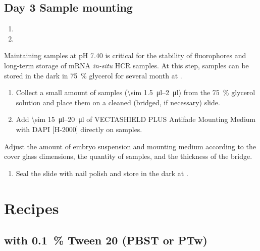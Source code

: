 \documentclass[10pt]{report}
\begin{document}
\subsection*{Day 3 \textendash{} Sample mounting}

\begin{enumerate}[series = steps]
	\item {}
	\item {}
\end{enumerate}

\bigskip\alert{Maintaining samples at pH 7.40 is critical for the stability of fluorophores and long-term storage of mRNA \textit{in-situ} HCR samples.}
\alert{At this step, samples can be stored in the dark in \qty{75}{\percent} glycerol for several month at \fourdegree.}

\begin{enumerate}[resume = steps]
	\item Collect a small amount of samples (\qtyrange{\sim 1.5}{2}{\ul}) from the \qty{75}{\percent} glycerol solution and place them on a cleaned (bridged, if necessary) slide.
	\item Add \qtyrange{\sim 15}{20}{\ul} of VECTASHIELD\textregistered{} PLUS Antifade Mounting Medium with DAPI [H-2000] directly on samples.
\end{enumerate}

\bigskip\alert{Adjust the amount of embryo suspension and mounting medium according to the cover glass dimensions, the quantity of samples, and the thickness of the bridge.}

\begin{enumerate}[resume = steps]
	\item	Seal the slide with nail polish and store in the dark at \fourdegree.
\end{enumerate}

\clearpage

\section*{\textendash{} Recipes \textendash{}}

\subsection*{\pbs{} with \qty{0.1}{\percent} Tween 20 (PBST or PTw)}
\end{document}
